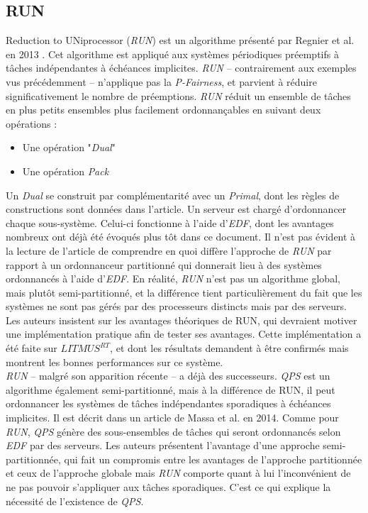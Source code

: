 \documentclass[11pt,a4paper,oneside]{report}
\begin{document}
\subsection{RUN}
Reduction to UNiprocessor (\textit{RUN}) est un algorithme présenté par Regnier et al. en 2013 \cite{regnier_multiprocessor_2013}. 
Cet algorithme est appliqué aux systèmes périodiques préemptifs à tâches indépendantes à 
échéances implicites. \textit{RUN} -- contrairement aux exemples vus précédemment -- n'applique pas 
la \textit{P-Fairness}, et parvient à réduire significativement le nombre de préemptions. 
\textit{RUN} réduit un ensemble de tâches en plus petits ensembles plus facilement ordonnançables 
en suivant deux opérations :\\
\begin{itemize}
    \item Une opération "\textit{Dual}"
    \item Une opération \textit{Pack}
\end{itemize}
Un \textit{Dual} se construit par complémentarité avec un \textit{Primal}, dont les règles de constructions sont 
données dans l'article.
Un serveur est chargé d'ordonnancer chaque sous-système. Celui-ci fonctionne à l'aide 
d'\textit{EDF}, dont les avantages nombreux ont déjà été évoqués plus tôt dans ce document. 
Il n'est pas évident à la lecture de l'article de comprendre en quoi 
diffère l'approche de \textit{RUN} par rapport à un ordonnanceur 
partitionné qui donnerait lieu à des systèmes ordonnancés à l'aide d'\textit{EDF}. 
En réalité, \textit{RUN} n'est pas un algorithme global, mais plutôt 
semi-partitionné, et la différence tient particulièrement du fait que les systèmes ne sont pas 
gérés par des processeurs distincts mais par des serveurs.  
Les auteurs insistent sur les avantages théoriques de RUN, qui devraient motiver une implémentation 
pratique afin de tester ses avantages. Cette implémentation a été faite 
\cite{compagnin_putting_2014} sur $LITMUS^{RT}$, et dont les résultats demandent à 
être confirmés mais montrent les bonnes performances sur ce système.\\

\textit{RUN} -- malgré son apparition récente -- a déjà des successeurs. \textit{QPS} est un algorithme 
également semi-partitionné, mais à la différence de RUN, il peut ordonnancer les systèmes 
de tâches indépendantes sporadiques à échéances implicites. 
Il est décrit dans un article de Massa et al. \cite{massa_outstanding_2014} en 2014. 
Comme pour \textit{RUN}, \textit{QPS} génère des sous-ensembles de tâches qui seront ordonnancés 
selon \textit{EDF} par des serveurs. Les auteurs présentent l'avantage d'une approche semi-partitionnée, 
qui fait un compromis entre les avantages de l'approche partitionnée et ceux de l'approche globale 
mais \textit{RUN} comporte quant à lui l'inconvénient de ne pas pouvoir s'appliquer aux tâches sporadiques. C'est ce qui explique la nécessité de l'existence de \textit{QPS}.
\end{document}
